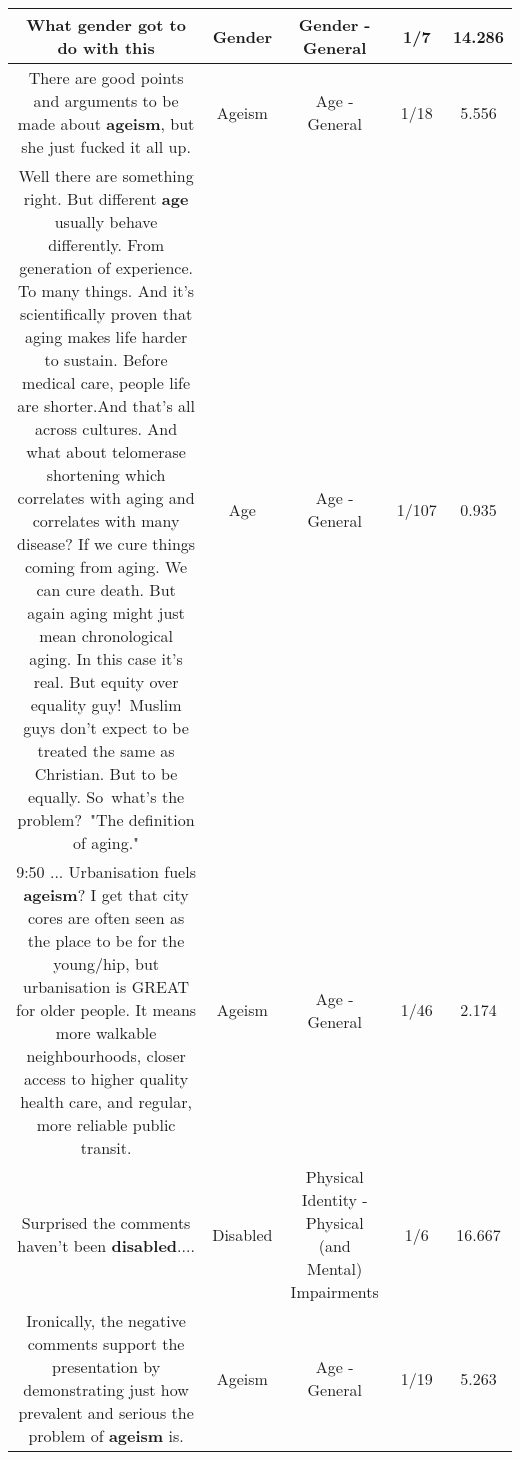 \documentclass[11pt]{article}
\newlength\mylength
\begin{document}
\begin{center}
\begin{longtable}{|C{.65\mylength}|C{.30\mylength}|C{.12\mylength}|C{.12\mylength}|C{.12\mylength}|}
  \small What \textbf{gender} got to do with this\normalsize   & Gender & Gender - General & 1/7 & 14.286 \\  \hline
  \small There are good points and arguments to be made about \textbf{ageism}, but she just fucked it all up.\normalsize   & Ageism & Age - General & 1/18 & 5.556 \\  \hline
  \small Well there are something right. But different \textbf{age} usually behave differently. From generation of experience. To many things. And it's scientifically proven that aging makes life harder to sustain. Before medical care, people life are shorter.And that's all across cultures. And what about telomerase shortening which correlates with aging and correlates with many disease? If we cure things coming from aging. We can cure death. But again aging might just mean chronological aging. In this case it's real. But equity over equality guy! Muslim guys don't expect to be treated the same as Christian. But to be equally. So what's the problem? "The definition of aging."\normalsize   & Age & Age - General & 1/107 & 0.935 \\  \hline
  \small 9:50 ... Urbanisation fuels \textbf{ageism}?  I get that city cores are often seen as the place to be for the young/hip, but urbanisation is GREAT for older people.  It means more walkable neighbourhoods, closer access to higher quality health care, and regular, more reliable public transit.\normalsize   & Ageism & Age - General & 1/46 & 2.174 \\  \hline
  \small Surprised the comments haven't been \textbf{disabled}....\normalsize   & Disabled & Physical Identity - Physical (and Mental) Impairments & 1/6 & 16.667 \\  \hline
  \small Ironically, the negative comments support the presentation by demonstrating just how prevalent and serious the problem of \textbf{ageism} is.\normalsize   & Ageism & Age - General & 1/19 & 5.263 \\  \hline

\end{longtable}
\end{center}
\end{document}
